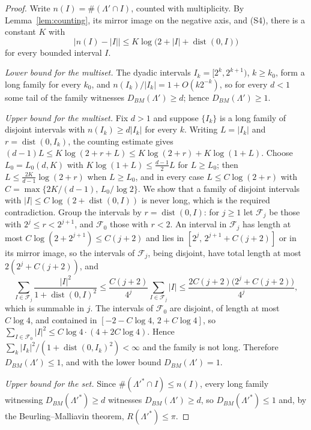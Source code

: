 \documentclass[11pt]{article}
\DeclareMathOperator{\dist}{dist}
\newcommand{\Lam}{\Lambda}
\begin{document}
\begin{proof}
Write $n(I)=\#(\Lam'\cap I)$, counted with multiplicity. By Lemma~\ref{lem:counting}, its mirror image on the negative axis, and (S4), there is a constant $K$ with
\[
\bigl|n(I)-|I|\bigr|\le K\log\bigl(2+|I|+\dist(0,I)\bigr)
\]
for every bounded interval $I$.

\emph{Lower bound for the multiset.} The dyadic intervals $I_k=[2^k,2^{k+1})$, $k\ge k_0$, form a long family for every $k_0$, and $n(I_k)/|I_k|=1+O(k2^{-k})$, so for every $d<1$ some tail of the family witnesses $D_{BM}(\Lam')\ge d$; hence $D_{BM}(\Lam')\ge1$.

\emph{Upper bound for the multiset.} Fix $d>1$ and suppose $\{I_k\}$ is a long family of disjoint intervals with $n(I_k)\ge d|I_k|$ for every $k$. Writing $L=|I_k|$ and $r=\dist(0,I_k)$, the counting estimate gives $(d-1)L\le K\log(2+r+L)\le K\log(2+r)+K\log(1+L)$. Choose $L_0=L_0(d,K)$ with $K\log(1+L)\le\frac{d-1}2L$ for $L\ge L_0$; then $L\le\frac{2K}{d-1}\log(2+r)$ when $L\ge L_0$, and in every case $L\le C\log(2+r)$ with $C=\max\{2K/(d-1),\,L_0/\log2\}$. We show that a family of disjoint intervals with $|I|\le C\log(2+\dist(0,I))$ is never long, which is the required contradiction. Group the intervals by $r=\dist(0,I)$: for $j\ge1$ let $\mathcal F_j$ be those with $2^j\le r<2^{j+1}$, and $\mathcal F_0$ those with $r<2$. An interval in $\mathcal F_j$ has length at most $C\log(2+2^{j+1})\le C(j+2)$ and lies in $[2^j,\,2^{j+1}+C(j+2)]$ or in its mirror image, so the intervals of $\mathcal F_j$, being disjoint, have total length at most $2(2^j+C(j+2))$, and
\[
\sum_{I\in\mathcal F_j}\frac{|I|^2}{1+\dist(0,I)^2}\le\frac{C(j+2)}{4^j}\sum_{I\in\mathcal F_j}|I|\le\frac{2C(j+2)\bigl(2^j+C(j+2)\bigr)}{4^j},
\]
which is summable in $j$. The intervals of $\mathcal F_0$ are disjoint, of length at most $C\log4$, and contained in $[-2-C\log4,\,2+C\log4]$, so $\sum_{I\in\mathcal F_0}|I|^2\le C\log4\cdot(4+2C\log4)$. Hence $\sum_k|I_k|^2/(1+\dist(0,I_k)^2)<\infty$ and the family is not long. Therefore $D_{BM}(\Lam')\le1$, and with the lower bound $D_{BM}(\Lam')=1$.

\emph{Upper bound for the set.} Since $\#(\Lam'^\ast\cap I)\le n(I)$, every long family witnessing $D_{BM}(\Lam'^\ast)\ge d$ witnesses $D_{BM}(\Lam')\ge d$, so $D_{BM}(\Lam'^\ast)\le1$ and, by the Beurling--Malliavin theorem, $R(\Lam'^\ast)\le\pi$.


\end{proof}
\end{document}
